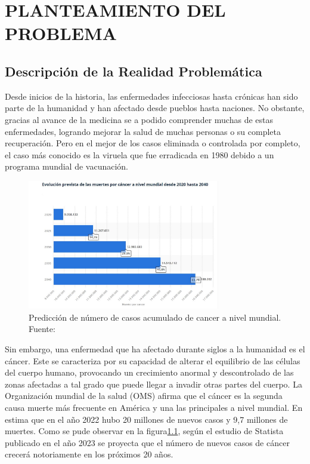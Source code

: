 \chapter{PLANTEAMIENTO DEL PROBLEMA}
\section{Descripción de la Realidad Problemática}

Desde inicios de la historia, las enfermedades infecciosas hasta crónicas han sido parte de la humanidad y han afectado desde pueblos hasta naciones. No obstante, gracias al avance de la medicina se a podido comprender muchas de estas enfermedades, logrando mejorar la salud de muchas personas o su completa recuperación. Pero en el mejor de los casos eliminada o controlada por completo, el caso más conocido es la viruela que fue erradicada en 1980 debido a un programa mundial de vacunación. 


\begin{figure}[h]
	\begin{center}
		\includegraphics[width=0.75\textwidth]{1/figures/Grafico1DiagnosnitoCancer.JPG}
		\caption{Predicción de número de casos acumulado de cancer a nivel mundial. Fuente: \cite{stadisitc_cancer}}
		\label{1:fig}
	\end{center}
\end{figure}


Sin embargo, una enfermedad que ha afectado durante siglos a la humanidad es el cáncer. Este se caracteriza por su capacidad de alterar el equilibrio de las células del cuerpo humano, provocando un crecimiento anormal y descontrolado de las zonas afectadas a tal grado que puede llegar a invadir otras partes del cuerpo. La Organización mundial de la salud (OMS) afirma que el cáncer es la segunda causa muerte más frecuente en América y una las principales a nivel mundial. En estima que en el año 2022 hubo 20 millones de nuevos casos y 9,7 millones de muertes. Como se pude observar en la figura\ref{1:fig}, según el estudio de Statista publicado en el año 2023 se proyecta que el número de nuevos casos de cáncer crecerá notoriamente en los próximos 20 años.\parencite{OMS_cancer}






